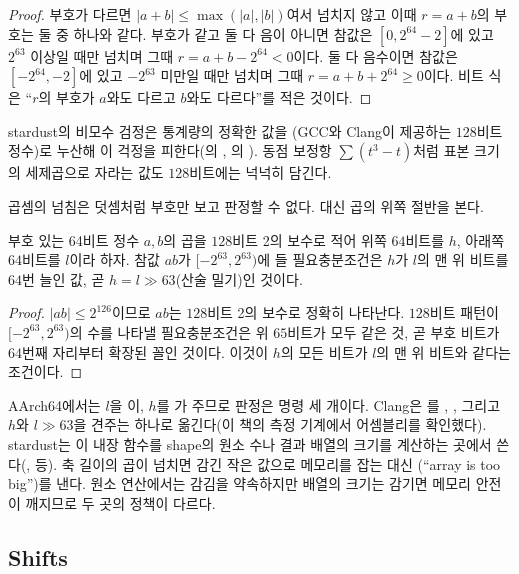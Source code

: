 \begin{proof}
부호가 다르면 $|a+b|\le\max(|a|,|b|)$여서 넘치지 않고 이때 $r=a+b$의 부호는 둘 중 하나와 같다. 부호가 같고 둘 다 음이 아니면 참값은 $[0,2^{64}-2]$에 있고 $2^{63}$ 이상일 때만 넘치며 그때 $r=a+b-2^{64}<0$이다. 둘 다 음수이면 참값은 $[-2^{64},-2]$에 있고 $-2^{63}$ 미만일 때만 넘치며 그때 $r=a+b+2^{64}\ge0$이다. 비트 식은 ``$r$의 부호가 $a$와도 다르고 $b$와도 다르다''를 적은 것이다.
\end{proof}

stardust의 비모수 검정은 통계량의 정확한 값을 (GCC와 Clang이 제공하는 $128$비트 정수)로 누산해 이 걱정을 피한다(의 , 의 ). 동점 보정항 $\sum(t^3-t)$처럼 표본 크기의 세제곱으로 자라는 값도 $128$비트에는 넉넉히 담긴다.

곱셈의 넘침은 덧셈처럼 부호만 보고 판정할 수 없다. 대신 곱의 위쪽 절반을 본다.

\begin{proposition}
\label{prop:mul-overflow}
부호 있는 64비트 정수 $a,b$의 곱을 $128$비트 2의 보수로 적어 위쪽 $64$비트를 $h$, 아래쪽 $64$비트를 $l$이라 하자. 참값 $ab$가 $[-2^{63},2^{63})$에 들 필요충분조건은 $h$가 $l$의 맨 위 비트를 $64$번 늘인 값, 곧 $h=l\gg63$(산술 밀기)인 것이다.
\end{proposition}

\begin{proof}
$|ab|\le2^{126}$이므로 $ab$는 $128$비트 2의 보수로 정확히 나타난다. $128$비트 패턴이 $[-2^{63},2^{63})$의 수를 나타낼 필요충분조건은 위 $65$비트가 모두 같은 것, 곧 부호 비트가 $64$번째 자리부터 확장된 꼴인 것이다. 이것이 $h$의 모든 비트가 $l$의 맨 위 비트와 같다는 조건이다.
\end{proof}

AArch64에서는 $l$을 이, $h$를 가 주므로 판정은 명령 세 개이다. Clang은 를 , , 그리고 $h$와 $l\gg63$을 견주는  하나로 옮긴다(이 책의 측정 기계에서 어셈블리를 확인했다). stardust는 이 내장 함수를 shape의 원소 수나 결과 배열의 크기를 계산하는 곳에서 쓴다(,  등). 축 길이의 곱이 넘치면 감긴 작은 값으로 메모리를 잡는 대신 (``array is too big'')를 낸다. 원소 연산에서는 감김을 약속하지만 배열의 크기는 감기면 메모리 안전이 깨지므로 두 곳의 정책이 다르다.

\subsection{Shifts}

